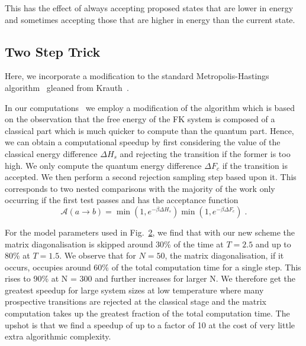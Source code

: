 This has the effect of always accepting proposed states that are lower in energy and sometimes accepting those that are higher in energy than the current state.

\hypertarget{two-step-trick}{%
\subsection{Two Step Trick}\label{two-step-trick}}

Here, we incorporate a modification to the standard Metropolis-Hastings algorithm~\autocite{hastingsMonteCarloSampling1970} gleaned from Krauth~\autocite{krauthIntroductionMonteCarlo1998}.

In our computations~\autocite{hodsonMCMCFKModel2021} we employ a modification of the algorithm which is based on the observation that the free energy of the FK system is composed of a classical part which is much quicker to compute than the quantum part. Hence, we can obtain a computational speedup by first considering the value of the classical energy difference \(\Delta H_s\) and rejecting the transition if the former is too high. We only compute the quantum energy difference \(\Delta F_c\) if the transition is accepted. We then perform a second rejection sampling step based upon it. This corresponds to two nested comparisons with the majority of the work only occurring if the first test passes and has the acceptance function \[\mathcal{A}(a \to b) = \min\left(1, e^{-\beta \Delta H_s}\right)\min\left(1, e^{-\beta \Delta F_c}\right)\;.\]

For the model parameters used in Fig.~\protect\hyperlink{fig:indiv_IPR}{2}, we find that with our new scheme the matrix diagonalisation is skipped around 30\% of the time at \(T = 2.5\) and up to 80\% at \(T = 1.5\). We observe that for \(N = 50\), the matrix diagonalisation, if it occurs, occupies around 60\% of the total computation time for a single step. This rises to 90\% at N = 300 and further increases for larger N. We therefore get the greatest speedup for large system sizes at low temperature where many prospective transitions are rejected at the classical stage and the matrix computation takes up the greatest fraction of the total computation time. The upshot is that we find a speedup of up to a factor of 10 at the cost of very little extra algorithmic complexity.

